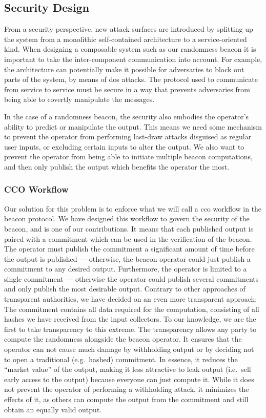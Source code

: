 \subsection{Security Design}%
\label{sub:security_design}

From a security perspective, new attack surfaces are introduced by splitting up the system from a monolithic self-contained architecture to a service-oriented kind.
When designing a composable system such as our randomness beacon it is important to take the inter-component communication into account.
For example, the architecture can potentially make it possible for adversaries to block out parts of the system, by means of \gls{dos} attacks.
The protocol used to communicate from service to service must be secure in a way that prevents adversaries from being able to covertly manipulate the messages.

In the case of a randomness beacon, the security also embodies the operator's ability to predict or manipulate the output.
This means we need some mechanism to prevent the operator from performing last-draw attacks disguised as regular user inputs, or excluding certain inputs to alter the output.
We also want to prevent the operator from being able to initiate multiple beacon computations, and then only publish the output which benefits the operator the most.

\subsubsection{CCO Workflow}
Our solution for this problem is to enforce what we will call a \gls{cco} workflow in the beacon protocol. We have designed this workflow to govern the security of the beacon, and is one of our contributions.
It means that each published output is paired with a commitment which can be used in the verification of the beacon.
The operator must publish the commitment a significant amount of time before the output is published --- otherwise, the beacon operator could just publish a commitment to any desired output.
Furthermore, the operator is limited to a single commitment --- otherwise the operator could publish several commitments and only publish the most desirable output.
Contrary to other approaches of transparent authorities, we have decided on an even more transparent approach: The commitment contains all data required for the computation, consisting of all hashes we have received from the input collectors. To our knowledge, we are the first to take transparency to this extreme.
The transparency allows any party to compute the randomness alongside the beacon operator.
It ensures that the operator can not cause much damage by withholding output or by deciding not to open a traditional (e.g.\ hashed) commitment. In essence, it reduces the \enquote{market value} of the output, making it less attractive to leak output (i.e.\ sell early access to the output) because everyone can just compute it. While it does not prevent the operator of performing a withholding attack, it minimizes the effects of it, as others can compute the output from the commitment and still obtain an equally valid output.

